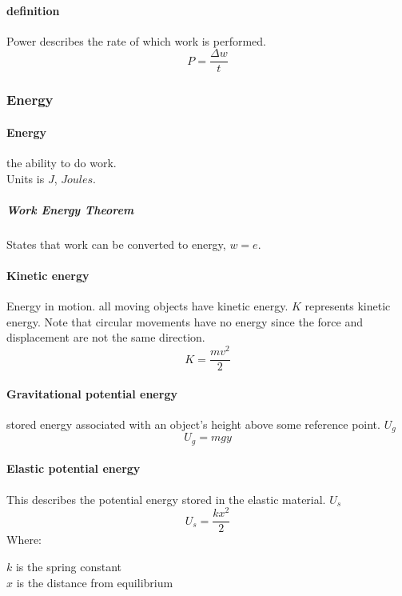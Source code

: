 \documentclass{article} %
\theoremstyle{theorem}
\theoremstyle{definition}
\begin{document}
            \paragraph{definition}
                Power describes the rate of which work is performed.
                \begin{equation} P=\dfrac{\Delta w}{t} \end{equation}
        \subsubsection{Energy}
            \paragraph{Energy}
                the ability to do work.\\ Units is $J$, $Joules$.
                \subparagraph{Work Energy Theorem}
                    States that work can be converted to energy, $w=e$.
            \paragraph{Kinetic energy}
                Energy in motion. all moving objects have kinetic energy. $K$ represents kinetic energy.
                Note that circular movements have no energy since the force and displacement are not the same direction.
                $$K=\frac{mv^2}{2}$$ 
            \paragraph{Gravitational potential energy}%
            \label{par:Gravitational potential energy}
                stored energy associated with an object's height above some reference point. $U_g$
                \begin{equation}
                    U_g=mgy
                \end{equation}
            \paragraph{Elastic potential energy}
                This describes the potential energy stored in the elastic material. $U_s$
                \begin{equation}
                    U_s=\frac{kx^2}{2}
                \end{equation}
                Where:\begin{center} $k$ is the spring constant\\$x$ is the distance from equilibrium \end{center}
\end{document}
